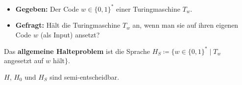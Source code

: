 \begin{itemize}[label={}]
    \item \textbf{Gegeben:} Der Code $w \in \{0,1\}^*$ einer Turingmaschine $T_w$.
    \item \textbf{Gefragt:} Hält die Turingmaschine $T_w$ an, wenn man sie auf ihren eigenen Code $w$ (als Input) ansetzt?
\end{itemize}

Das \textbf{allgemeine Halteproblem} ist die Sprache $H_S \coloneqq \{ w \in \{0,1\}^* \mid T_w$ angesetzt auf $w$ hält$\}$.

$H$, $H_0$ und $H_S$ sind semi-entscheidbar.

\vspace{-\baselineskip}
\hrulefill
